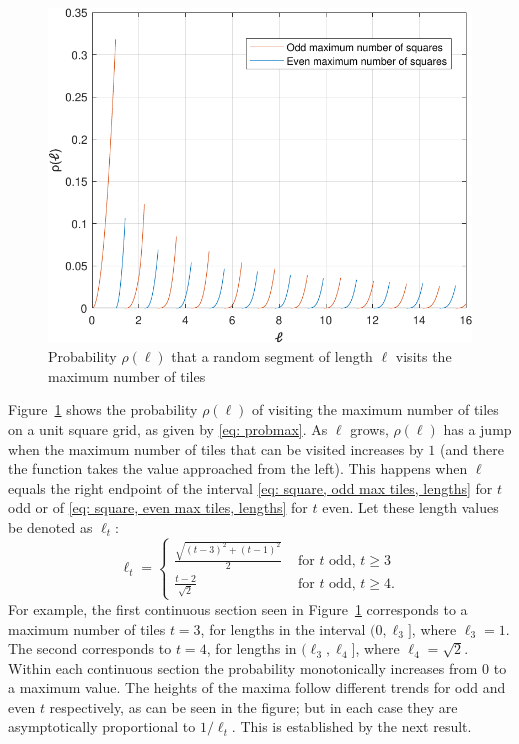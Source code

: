 \documentclass[12pt, a4paper]{article}
\newcommand{\probmax}{\rho} %
\newcommand{\len}{\ell} %
\newcommand{\tiles}{t} %
\begin{document}
\begin{figure}%
\centering%
\includegraphics[width=.75\textwidth]{probmax_len}%
\caption{Probability $\probmax(\len)$ that a random segment of length $\len$ visits the maximum number of tiles%
}%
\label{fig: probmax_len}%
\end{figure}%

Figure~\ref{fig: probmax_len} shows the probability $\probmax(\len)$ of visiting the maximum number of tiles on a unit square grid, as given by \eqref{eq: probmax}. As $\len$ grows, $\probmax(\len)$ has a jump when the maximum number of tiles that can be visited increases by $1$ (and there the function takes the value approached from the left). This happens when $\len$ equals the right endpoint of the interval \eqref{eq: square, odd max tiles, lengths} for $\tiles$ odd or of \eqref{eq: square, even max tiles, lengths} for $\tiles$ even. Let these length values be denoted as $\len_\tiles$:
\begin{equation}
\len_\tiles = \begin{cases}
\displaystyle
\frac{\sqrt{(\tiles-3)^2 + (\tiles-1)^2}} {2} & \text{ for $\tiles$ odd, $\tiles \geq 3$} \\
\displaystyle
\frac{\tiles-2}{\sqrt{2}} & \text{ for $\tiles$ odd, $\tiles \geq 4$}.
\end{cases}
\end{equation}
For example, the first continuous section seen in Figure~\ref{fig: probmax_len} corresponds to a maximum number of tiles $\tiles=3$, for lengths in the interval $(0, \len_3]$, where $\len_3= 1$. The second corresponds to $\tiles=4$, for lengths in $(\len_3, \len_4]$, where $\len_4= \sqrt{2}$. Within each continuous section the probability monotonically increases from $0$ to a maximum value. The heights of the maxima follow different trends for odd and even $\tiles$ respectively, as can be seen in the figure; but in each case they are asymptotically proportional to $1/\len_\tiles$. This is established by the next result.
\end{document}
